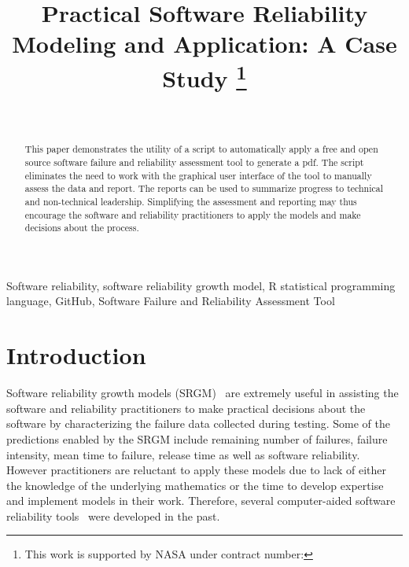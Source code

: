 \documentclass[journal]{IEEEtran}
\begin{document}
\title{Practical Software Reliability Modeling and Application: A Case Study
\thanks{This work is supported by NASA under contract number: }
}

\author{ \\%
\and
{}
}

\maketitle

\begin{abstract}
This paper demonstrates the utility of a script to automatically apply a free and open source software failure and reliability assessment tool to generate a pdf. The script eliminates the need to work with the graphical user interface of the tool to manually assess the data and report. The reports can be used to summarize progress to technical and non-technical leadership. Simplifying the assessment and reporting may thus encourage the software and reliability practitioners to apply the models and make decisions about the process.
\end{abstract}

\begin{IEEEkeywords}
Software reliability, software reliability growth model, R statistical programming language, GitHub, Software Failure and Reliability Assessment Tool
\end{IEEEkeywords}


\section{Introduction}\label{sec:Intro}
Software reliability growth models (SRGM)~\cite{BookHoSRE} are extremely useful in assisting the software and reliability practitioners to make practical decisions about the software by characterizing the failure data collected during testing. Some of the predictions enabled by the SRGM include remaining number of failures, failure intensity, mean time to failure, release time as well as software reliability. However practitioners are reluctant to apply these models due to lack of either the knowledge of the underlying mathematics or the time to develop expertise and implement models in their work. Therefore, several computer-aided software reliability tools~\cite{trSMERFS,inProcISSRE2013_100,lyu1992casre} were developed in the past.
\end{document}
